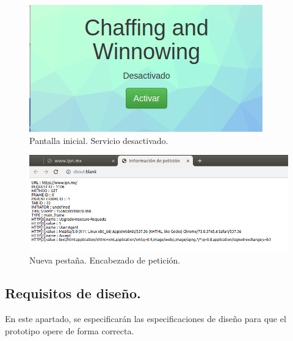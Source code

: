 \documentclass[12pt, a4paper, titlepage]{report}
\begin{document}
				\begin{figure}[H]
					\begin{center}	\includegraphics[width=13
					cm]{./imagenes/Desarrollo/Prototipo_1/UI_desactivado.png}
						\caption{Pantalla inicial. Servicio desactivado.}
					\end{center}
				\end{figure}
				\label{UI_DESACTIVADO_4.8}
				
				\begin{figure}[H]
					\begin{center}	\includegraphics[width=13cm]{./imagenes/Desarrollo/Prototipo_1/UI_tabDatos.png}
						\caption{Nueva pestaña. Encabezado de petición.}
					\end{center}
				\end{figure}
				\label{UI_tabDatos_4.9}
			    
			\subsection{Requisitos de diseño.}
			   En este apartado, se especificarán las especificaciones de diseño para que el prototipo opere de forma correcta.
\end{document}
